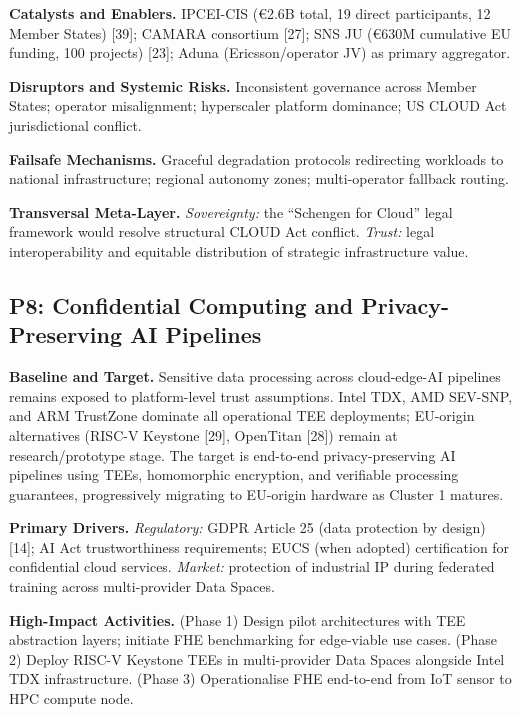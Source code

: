 \documentclass{ieeeaccess}
\begin{document}
\textbf{Catalysts and Enablers.} IPCEI-CIS (€2.6B total, 19 direct
participants, 12 Member States) {[}39{]}; CAMARA consortium {[}27{]};
SNS JU (€630M cumulative EU funding, 100 projects) {[}23{]}; Aduna
(Ericsson/operator JV) as primary aggregator.

\textbf{Disruptors and Systemic Risks.} Inconsistent governance across
Member States; operator misalignment; hyperscaler platform dominance; US
CLOUD Act jurisdictional conflict.

\textbf{Failsafe Mechanisms.} Graceful degradation protocols redirecting
workloads to national infrastructure; regional autonomy zones;
multi-operator fallback routing.

\textbf{Transversal Meta-Layer.} \emph{Sovereignty:} the ``Schengen for
Cloud'' legal framework would resolve structural CLOUD Act conflict.
\emph{Trust:} legal interoperability and equitable distribution of
strategic infrastructure value.

\subsection{P8: Confidential Computing and Privacy-Preserving AI
Pipelines}\label{p8-confidential-computing-and-privacy-preserving-ai-pipelines}

\textbf{Baseline and Target.} Sensitive data processing across
cloud-edge-AI pipelines remains exposed to platform-level trust
assumptions. Intel TDX, AMD SEV-SNP, and ARM TrustZone dominate all
operational TEE deployments; EU-origin alternatives (RISC-V Keystone
{[}29{]}, OpenTitan {[}28{]}) remain at research/prototype stage. The
target is end-to-end privacy-preserving AI pipelines using TEEs,
homomorphic encryption, and verifiable processing guarantees,
progressively migrating to EU-origin hardware as Cluster 1 matures.

\textbf{Primary Drivers.} \emph{Regulatory:} GDPR Article 25 (data
protection by design) {[}14{]}; AI Act trustworthiness requirements;
EUCS (when adopted) certification for confidential cloud services.
\emph{Market:} protection of industrial IP during federated training
across multi-provider Data Spaces.

\textbf{High-Impact Activities.} (Phase 1) Design pilot architectures
with TEE abstraction layers; initiate FHE benchmarking for edge-viable
use cases. (Phase 2) Deploy RISC-V Keystone TEEs in multi-provider Data
Spaces alongside Intel TDX infrastructure. (Phase 3) Operationalise FHE
end-to-end from IoT sensor to HPC compute node.
\end{document}
